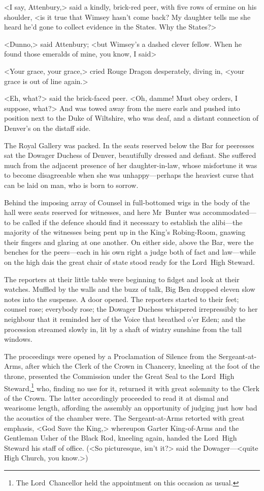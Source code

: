 <I say, Attenbury,> said a kindly, brick-red peer, with five rows of ermine on his shoulder, <is it true that Wimsey hasn't come back?  My daughter tells me she heard he'd gone to collect evidence in the States. Why the States?>

<Dunno,> said Attenbury; <but Wimsey's a dashed clever fellow. When he found those emeralds of mine, you know, I said\longdash>

<Your grace, your grace,> cried Rouge Dragon desperately, diving in, <your grace is out of line again.>

<Eh, what?> said the brick-faced peer. <Oh, damme! Must obey orders, I suppose, what?> And was towed away from the mere earls and pushed into position next to the Duke of Wiltshire, who was deaf, and a distant connection of Denver's on the distaff side.

The Royal Gallery was packed. In the seats reserved below the Bar for peeresses sat the Dowager Duchess of Denver, beautifully dressed and defiant. She suffered much from the adjacent presence of her daughter-in-law, whose misfortune it was to become disagreeable when she was unhappy—perhaps the heaviest curse that can be laid on man, who is born to sorrow.

Behind the imposing array of Counsel in full-bottomed wigs in the body of the hall were seats reserved for witnesses, and here Mr~Bunter was accommodated—to be called if the defence should find it necessary to establish the alibi—the majority of the witnesses being pent up in the King's Robing-Room, gnawing their fingers and glaring at one another.  On either side, above the Bar, were the benches for the peers—each in his own right a judge both of fact and law—while on the high dais the great chair of state stood ready for the Lord~High Steward.

The reporters at their little table were beginning to fidget and look at their watches. Muffled by the walls and the buzz of talk, Big Ben dropped eleven slow notes into the suspense. A door opened.  The reporters started to their feet; counsel rose; everybody rose; the Dowager Duchess whispered irrepressibly to her neighbour that it reminded her of the Voice that breathed o'er Eden; and the procession streamed slowly in, lit by a shaft of wintry sunshine from the tall windows.

The proceedings were opened by a Proclamation of Silence from the Sergeant-at-Arms, after which the Clerk of the Crown in Chancery, kneeling at the foot of the throne, presented the Commission under the Great Seal to the Lord~High Steward,\footnote{The Lord~Chancellor held the appointment on this occasion as usual.} who, finding no use for it, returned it with great solemnity to the Clerk of the Crown. The latter accordingly proceeded to read it at dismal and wearisome length, affording the assembly an opportunity of judging just how bad the acoustics of the chamber were. The Sergeant-at-Arms retorted with great emphasis, <God Save the King,> whereupon Garter King-of-Arms and the Gentleman Usher of the Black Rod, kneeling again, handed the Lord~High Steward his staff of office. (<So picturesque, isn't it?> said the Dowager—<quite High Church, you know.>)

